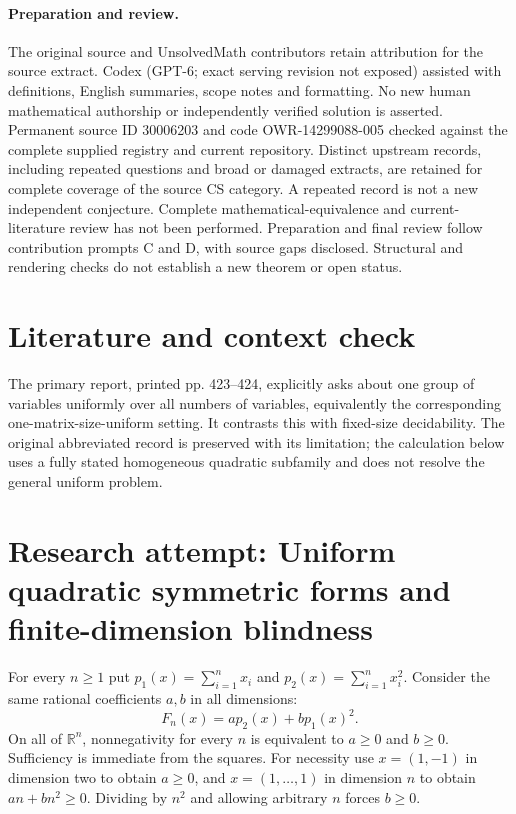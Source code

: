 \documentclass[11pt]{article}
\begin{document}
\paragraph{Preparation and review.}
The original source and UnsolvedMath contributors retain attribution for the source extract. Codex (GPT-6; exact serving revision not exposed) assisted with definitions, English summaries, scope notes and formatting. No new human mathematical authorship or independently verified solution is asserted. Permanent source ID 30006203 and code OWR-14299088-005 checked against the complete supplied registry and current repository. Distinct upstream records, including repeated questions and broad or damaged extracts, are retained for complete coverage of the source CS category. A repeated record is not a new independent conjecture. Complete mathematical-equivalence and current-literature review has not been performed. Preparation and final review follow contribution prompts C and D, with source gaps disclosed. Structural and rendering checks do not establish a new theorem or open status.
\label{end:30006203}

\section{Literature and context check}
The primary report, printed pp. 423--424, explicitly asks about one group of variables uniformly over all numbers of variables, equivalently the corresponding one-matrix-size-uniform setting. It contrasts this with fixed-size decidability. The original abbreviated record is preserved with its limitation; the calculation below uses a fully stated homogeneous quadratic subfamily and does not resolve the general uniform problem.
\section{Research attempt: Uniform quadratic symmetric forms and finite-dimension blindness}

For every $n\geq1$ put $p_1(x)=\sum_{i=1}^n x_i$ and $p_2(x)=\sum_{i=1}^n x_i^2$. Consider the same rational coefficients $a,b$ in all dimensions:
\[
F_n(x)=a p_2(x)+b p_1(x)^2.
\]
On all of $\mathbb R^n$, nonnegativity for every $n$ is equivalent to $a\geq0$ and $b\geq0$. Sufficiency is immediate from the squares. For necessity use $x=(1,-1)$ in dimension two to obtain $a\geq0$, and $x=(1,\ldots,1)$ in dimension $n$ to obtain $an+bn^2\geq0$. Dividing by $n^2$ and allowing arbitrary $n$ forces $b\geq0$.
\end{document}
